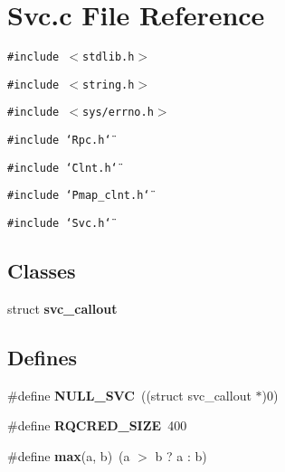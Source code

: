 \section{Svc.c File Reference}
\label{Svc_8c}
{\tt \#include $<$stdlib.h$>$}\par
{\tt \#include $<$string.h$>$}\par
{\tt \#include $<$sys/errno.h$>$}\par
{\tt \#include \char`\"{}Rpc.h\char`\"{}}\par
{\tt \#include \char`\"{}Clnt.h\char`\"{}}\par
{\tt \#include \char`\"{}Pmap\_\-clnt.h\char`\"{}}\par
{\tt \#include \char`\"{}Svc.h\char`\"{}}\par
\subsection*{Classes}
\begin{CompactItemize}
\item 
struct {\bf svc\_\-callout}
\end{CompactItemize}
\subsection*{Defines}
\begin{CompactItemize}
\item 
\#define {\bf NULL\_\-SVC}\ ((struct svc\_\-callout $\ast$)0)
\item 
\#define {\bf RQCRED\_\-SIZE}\ 400
\item 
\#define {\bf max}(a, b)\ (a $>$ b ? a : b)
\end{CompactItemize}
